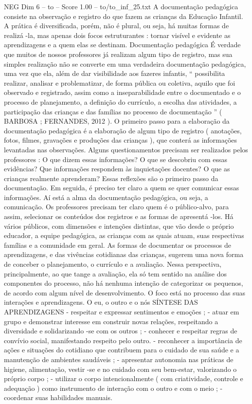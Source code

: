 \begin{textsample}{NEG Dim 6 – to – Score 1.00 – to/to\_inf\_25.txt}  \label{ex:f6_neg_118}
A documentação pedagógica consiste na observação e registro do que fazem as crianças da Educação Infantil.
A prática é diversificada, porém, não é plural, ou seja, há muitas formas de realizá -la, mas apenas dois focos estruturantes : tornar visível e evidente as aprendizagens e a quem elas se destinam.
Documentação pedagógica É verdade que muitos de nossos professores já realizam algum tipo de registro, mas sua simples realização não se converte em uma verdadeira documentação pedagógica, uma vez que ela, além de dar visibilidade aos fazeres infantis, “ possibilita realizar, analisar e problematizar, de forma pública ou coletiva, aquilo que foi observado e registrado, assim como a inseparabilidade entre o documentado e o processo de planejamento, a definição do currículo, a escolha das atividades, a participação das crianças e das famílias no processo de documentação ” ( BARBOSA ; FERNANDES, 2012 ).
O primeiro passo para a elaboração da documentação pedagógica é a elaboração de algum tipo de registro ( anotações, fotos, filmes, gravações e produções das crianças ), que conterá as informações levantadas nas observações.
Alguns questionamentos precisam ser realizados pelos professores : O que dizem essas informações?
O que se descobriu com essas evidências?
Que informações respondem às inquietações docentes?
O que as crianças realmente aprenderam?
Essas reflexões são o primeiro passo da documentação.
Em seguida, é preciso ter claro a quem se quer comunicar essas informações.
Aí está a alma da documentação pedagógica, ou seja, a comunicação.
Os professores precisam ter claro quem é o público-alvo, para assim, selecionar os conteúdos dos registros e as formas de apresentá -los.
Há vários públicos, com dimensões e intenções distintas, que vão desde o próprio educador, a equipe pedagógica, as crianças com as quais atuam, suas respectivas famílias e a comunidade em geral.
As formas de documentar os processos de aprendizagens, e das vivências cotidianas das crianças, sugerem uma nova forma de conceber o planejamento, o currículo e a avaliação.
Nessa perspectiva, principalmente, ao que tange a avaliação, ela só tem sentido na análise dos componentes do processo, não há nenhuma intenção de categorizar os pequenos, de acordo com algum nível de desenvolvimento.
O foco está no processo das suas interações e aprendizagens.
O eu, o outro e o nós SÍNTESE DAS APRENDIZAGENS - respeitar e expressar sentimentos e emoções ; - atuar em grupo e demonstrar interesse em construir novas relações, respeitando a diversidade e solidarizando -se com os outros ; - conhecer e respeitar regras de convívio social, manifestando respeito pelo outro. - reconhecer a importância de ações e situações do cotidiano que contribuem para o cuidado de sua saúde e a manutenção de ambientes saudáveis ; - apresentar autonomia nas práticas de higiene, alimentação, vestir -se e no cuidado com seu bem-estar, valorizando o próprio corpo ; - utilizar o corpo intencionalmente ( com criatividade, controle e adequação ) como instrumento de interação com o outro e com o meio ; - coordenar suas habilidades manuais.

\end{textsample}

